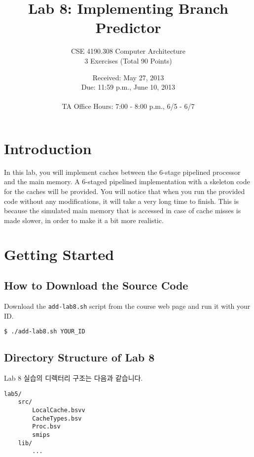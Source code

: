 \documentclass{article}
\begin{document}
\title{Lab 8: Implementing Branch Predictor}   %
\author{CSE 4190.308 Computer Architecture \\ 3 Exercises (Total 90 Points) }         
\date{Received: May 27, 2013 \\Due: 11:59 p.m., June 10, 2013\\ \ \\ TA Office
Hours: 7:00 - 8:00 p.m., 6/5 - 6/7}    %
\maketitle

\section{Introduction}
In this lab, you will implement caches between the 6-stage pipelined
processor and the main memory. A 6-staged pipelined implementation
with a skeleton code for the caches will be provided.
You will notice that when you run the provided code without any
modifications, it will take a very long time to finish. This is
because the simulated main memory that is accessed in case of cache
misses is made slower, in order to make it a bit more realistic.


\section{Getting Started}

\subsection{How to Download the Source Code}
Download the \texttt{add-lab8.sh} script from the course web page and run it with your ID.

\begin{Verbatim}[frame=single]
   $ ./add-lab8.sh YOUR_ID
\end{Verbatim}

\subsection{Directory Structure of Lab 8}
Lab 8 실습의 디렉터리 구조는 다음과 같습니다.

\begin{Verbatim}[frame=single]
lab5/
    src/	
        LocalCache.bsvv
        CacheTypes.bsv
        Proc.bsv
        smips
    lib/
        ...
\end{Verbatim}
\end{document}
